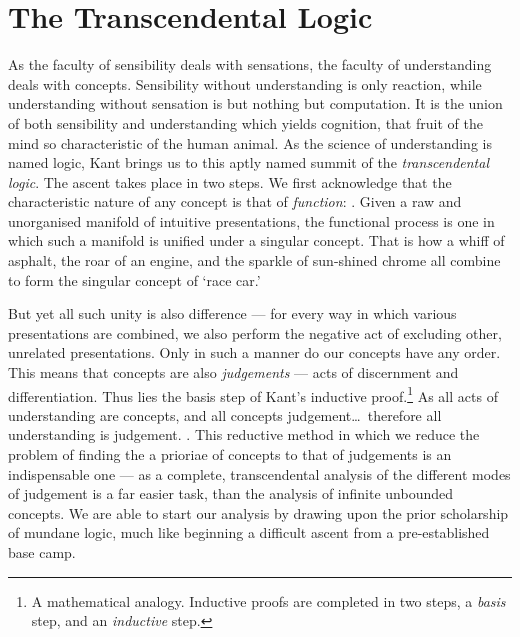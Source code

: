 \section{The Transcendental Logic}
As the faculty of sensibility deals with sensations, the faculty of understanding deals with concepts. Sensibility without understanding is only reaction, while understanding without sensation is but nothing but computation. It is the union of both sensibility and understanding which yields cognition, that fruit of the mind so characteristic of the human animal. As the science of understanding is named logic, Kant brings us to this aptly named summit of the \emph{transcendental logic}. The ascent takes place in two steps. We first acknowledge that the characteristic nature of any concept is that of \emph{function}: . Given a raw and unorganised manifold of intuitive presentations, the functional process is one in which such a manifold is unified under a singular concept. That is how a whiff of asphalt, the roar of an engine, and the sparkle of sun-shined chrome all combine to form the singular concept of \enquote*{race car.}

But yet all such unity is also difference --- for every way in which various presentations are combined, we also perform the negative act of excluding other, unrelated presentations. Only in such a manner do our concepts have any order. This means that concepts are also \emph{judgements} --- acts of discernment and differentiation. Thus lies the basis step of Kant's inductive proof.\footnote{A mathematical analogy. Inductive proofs are completed in two steps, a \emph{basis} step, and an \emph{inductive} step.} As all acts of understanding are concepts, and all concepts judgement\ldots\ therefore all understanding is judgement. . This reductive method in which we reduce the problem of finding the a prioriae of concepts to that of judgements is an indispensable one --- as a complete, transcendental analysis of the different modes of judgement is a far easier task, than the analysis of infinite unbounded concepts. We are able to start our analysis by drawing upon the prior scholarship of mundane logic, much like beginning a difficult ascent from a pre-established base camp.




